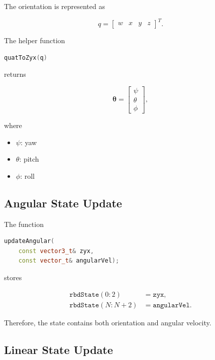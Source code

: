 The orientation is represented as

\begin{equation}
q =
\begin{bmatrix}
w & x & y & z
\end{bmatrix}^{T}.
\end{equation}

The helper function

\begin{lstlisting}[language=C++]
quatToZyx(q)
\end{lstlisting}

returns

\begin{equation}
\boldsymbol{\theta}
=
\begin{bmatrix}
\psi \\
\theta \\
\phi
\end{bmatrix},
\end{equation}

where

\begin{itemize}
    \item \(\psi\): yaw
    \item \(\theta\): pitch
    \item \(\phi\): roll
\end{itemize}

\subsection{Angular State Update}

The function

\begin{lstlisting}[language=C++]
updateAngular(
    const vector3_t& zyx,
    const vector_t& angularVel);
\end{lstlisting}

stores

\begin{align}
\texttt{rbdState}(0:2)
    &= \texttt{zyx},\\
\texttt{rbdState}(N:N+2)
    &= \texttt{angularVel}.
\end{align}

Therefore, the state contains both orientation and angular velocity.

\subsection{Linear State Update}

